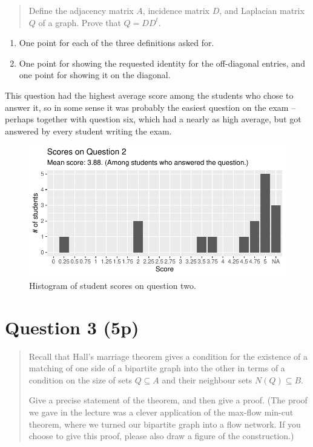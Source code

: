 \documentclass[nobib]{tufte-handout}
\begin{document}
\begin{quotation}
  Define the adjacency matrix $A$, incidence matrix $D$, and Laplacian matrix $Q$ of a graph. Prove that $Q = DD^t$.
\end{quotation}

\begin{enumerate}
  \item One point for each of the three definitions asked for.
  \item One point for showing the requested identity for the off-diagonal entries, and one point for showing it on the diagonal.
\end{enumerate}

This question had the highest average score among the students who chose to answer it, so in some sense it was probably the easiest question on the exam -- perhaps together with question six, which had a nearly as high average, but got answered by every student writing the exam.

\begin{figure}[p]
  \centering
  \includegraphics[width = \textwidth]{Q2.pdf}
  \caption[Score histogram for Q2]{Histogram of student scores on question two.}
  \label{fig:Q2}
\end{figure}

\section{Question 3 (5p)} %

\begin{quotation}
  Recall that Hall's marriage theorem gives a condition for the existence of a matching of one side of a bipartite graph into the other in terms of a condition on the size of sets $Q \subseteq A$ and their neighbour sets $N(Q) \subseteq B$.

  Give a precise statement of the theorem, and then give a proof. (The proof we gave in the lecture was a clever application of the max-flow min-cut theorem, where we turned our bipartite graph into a flow network. If you choose to give this proof, please also draw a figure of the construction.)
\end{quotation}
\end{document}
